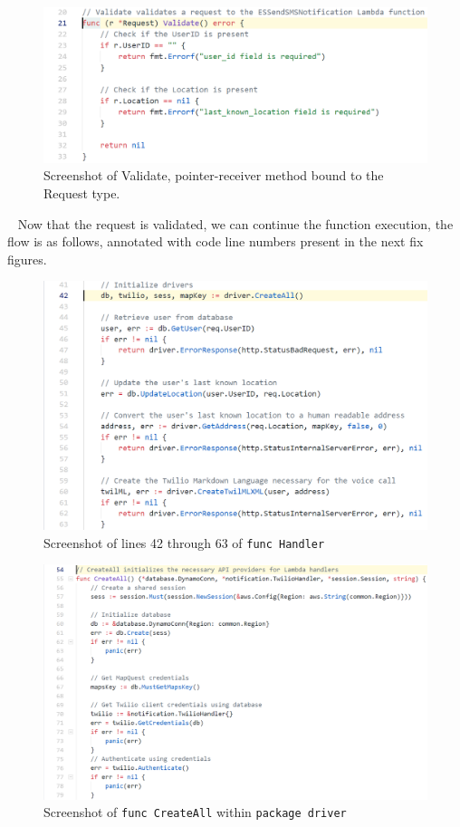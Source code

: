 \documentclass[10pt, a4paper]{article}
\begin{document}
\begin{figure}[H]
  \includegraphics[scale=.6]{code-screenshots/nine.png}
  \caption{Screenshot of Validate, pointer-receiver method bound to the Request type.}
\end{figure}

\par ~ Now that the request is validated, we can continue the function execution, the flow is as follows, annotated with code line numbers present in the next fix figures.
\begin{figure}[H]
  \includegraphics[scale=.6]{code-screenshots/handler-42-63.png}
  \caption{Screenshot of lines 42 through 63 of \texttt{func Handler}}\label{fig:hm}
\end{figure}

\begin{figure}[H]
  \includegraphics[scale=.6]{code-screenshots/create-all.png}
  \caption{Screenshot of \texttt{func CreateAll} within \texttt{package driver}}\label{fig:ca}
\end{figure}
\end{document}
